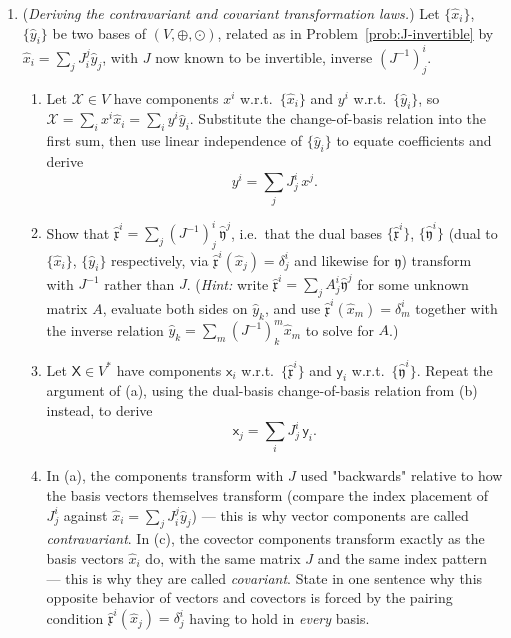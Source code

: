 \documentclass[11pt]{article}
\newcommand{\Vsp}{(V, \oplus, \odot)}
\newcommand{\dual}{V^{*}}
\begin{document}
\begin{enumerate}[label=\textbf{2.\arabic*}, leftmargin=2.2cm, start=7]

\item \label{prob:transf-laws}
(\textit{Deriving the contravariant and covariant transformation laws.})
Let $\{\hat{x}_i\}$, $\{\hat{y}_i\}$ be two bases of $\Vsp$, related as in Problem~\ref{prob:J-invertible} by $\hat{x}_i = \sum_j J_i^j \hat{y}_j$, with $J$ now known to be invertible, inverse $(J^{-1})^i_j$.
\begin{enumerate}[label=(\alph*)]
  \item Let $\mathcal{X}\in V$ have components $x^i$ w.r.t.\ $\{\hat x_i\}$ and $y^i$ w.r.t.\ $\{\hat y_i\}$, so $\mathcal X=\sum_i x^i\hat x_i=\sum_i y^i\hat y_i$. Substitute the change-of-basis relation into the first sum, then use linear independence of $\{\hat y_i\}$ to equate coefficients and derive
  \[
  y^i=\sum_j J^i_j\,x^j.
  \]
  \item Show that $\hat{\mathfrak{x}}^i=\sum_j(J^{-1})^i_j\,\hat{\mathfrak{y}}^j$, i.e.\ that the dual bases $\{\hat{\mathfrak x}^i\}$, $\{\hat{\mathfrak y}^i\}$ (dual to $\{\hat x_i\}$, $\{\hat y_i\}$ respectively, via $\hat{\mathfrak x}^i(\hat x_j)=\delta^i_j$ and likewise for $\mathfrak y$) transform with $J^{-1}$ rather than $J$. (\emph{Hint:} write $\hat{\mathfrak x}^i=\sum_j A^i_j\hat{\mathfrak y}^j$ for some unknown matrix $A$, evaluate both sides on $\hat y_k$, and use $\hat{\mathfrak x}^i(\hat x_m)=\delta^i_m$ together with the inverse relation $\hat y_k=\sum_m(J^{-1})^m_k\hat x_m$ to solve for $A$.)
  \item Let $\mathsf X\in\dual$ have components $\mathsf x_i$ w.r.t.\ $\{\hat{\mathfrak x}^i\}$ and $\mathsf y_i$ w.r.t.\ $\{\hat{\mathfrak y}^i\}$. Repeat the argument of (a), using the dual-basis change-of-basis relation from (b) instead, to derive
  \[
  \mathsf x_j=\sum_i J^i_j\,\mathsf y_i.
  \]
  \item In (a), the components transform with $J$ used "backwards" relative to how the basis vectors themselves transform (compare the index placement of $J^i_j$ against $\hat x_i=\sum_j J_i^j\hat y_j$) — this is why vector components are called \emph{contravariant}. In (c), the covector components transform exactly as the basis vectors $\hat x_i$ do, with the same matrix $J$ and the same index pattern — this is why they are called \emph{covariant}. State in one sentence why this opposite behavior of vectors and covectors is forced by the pairing condition $\hat{\mathfrak x}^i(\hat x_j)=\delta^i_j$ having to hold in \emph{every} basis.
\end{enumerate}


\end{enumerate}
\end{document}
